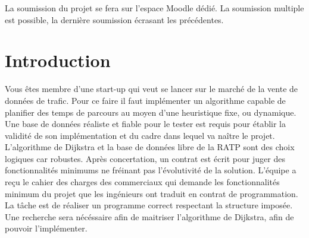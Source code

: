 \documentclass[9pts]{article}
\renewcommand{\headrulewidth}{0pt}
\begin{document}
La soumission du projet se fera sur l'espace Moodle dédié. La soumission multiple est possible, la dernière soumission écrasant les précédentes.

\pagebreak
\renewcommand{\headrulewidth}{1pt}


\section{Introduction}
Vous êtes membre d'une start-up qui veut se lancer sur le marché de la vente de données de trafic.
Pour ce faire il faut implémenter un algorithme capable de planifier des temps de parcours au moyen d'une heuristique fixe, ou dynamique.
Une base de données réaliste et fiable pour le tester est requis pour établir la validité de son implémentation et du cadre dans lequel va naître le projet.
L'algorithme de Dijkstra et la base de données libre de la RATP sont des choix logiques car robustes.
Après concertation, un contrat est écrit pour juger des fonctionnalités minimums ne fréinant pas l'évolutivité de la solution.
L'équipe a reçu le cahier des charges des commerciaux qui demande les fonctionnalités minimum du projet que les ingénieurs ont traduit en contrat de programmation. La tâche est de réaliser un programme correct respectant la structure imposée. Une recherche sera nécéssaire afin de maitriser l'algorithme de Dijkstra, afin de pouvoir l'implémenter.
\end{document}

